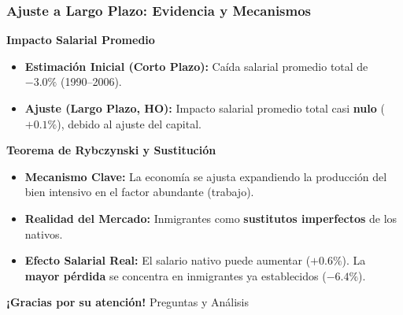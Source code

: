 \documentclass{beamer}
\begin{document}
\begin{frame}
\frametitle{Ajuste a Largo Plazo: Evidencia y Mecanismos}
\begin{block}{\textbf{Impacto Salarial Promedio}}
\begin{itemize}
\item \textbf{Estimación Inicial (Corto Plazo):} Caída salarial promedio total de $\mathbf{-3.0\%}$ (1990–2006).
\item \textbf{Ajuste (Largo Plazo, HO):} Impacto salarial promedio total casi \textbf{nulo} ($\mathbf{+0.1\%}$), debido al ajuste del capital.
\end{itemize}
\end{block}

\begin{alertblock}{\textbf{Teorema de Rybczynski y Sustitución}}
\begin{itemize}
\item \textbf{Mecanismo Clave:} La economía se ajusta expandiendo la producción del bien intensivo en el factor abundante (trabajo).
\item \textbf{Realidad del Mercado:} Inmigrantes como \textbf{sustitutos imperfectos} de los nativos.
\item \textbf{Efecto Salarial Real:} El salario nativo puede \alert{aumentar} ($\mathbf{+0.6\%}$). La \textbf{mayor pérdida} se concentra en inmigrantes ya establecidos ($\mathbf{-6.4\%}$).
\end{itemize}
\end{alertblock}
\end{frame}


\begin{frame}
\centering
\Huge \textbf{¡Gracias por su atención!}
\vfill
\Large Preguntas y Análisis
\end{frame}
\end{document}
